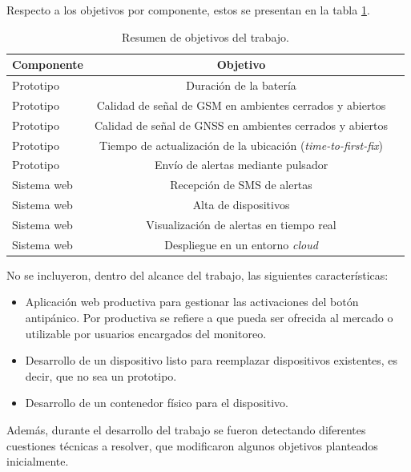 Respecto a los objetivos por componente, estos se presentan en la tabla \ref{tab:objetivos-iniciales}.
\begin{table}[h]
	\centering
	\caption[Resumen de objetivos del trabajo.]{Resumen de objetivos del trabajo.}
	\begin{tabular}{l c c}    
		\toprule
		\textbf{Componente} 	 & \textbf{Objetivo} 	  \\
		\midrule
		Prototipo & Duración de la batería 				\\		
		Prototipo & Calidad de señal de GSM en ambientes cerrados y abiertos			\\
		Prototipo & Calidad de señal de GNSS en ambientes cerrados y abiertos			\\
		Prototipo & Tiempo de actualización de la ubicación (\textit{time-to-first-fix}) \\
		Prototipo & Envío de alertas mediante pulsador		\\
		Sistema web & Recepción de SMS de alertas			\\
		Sistema web & Alta de dispositivos			\\
		Sistema web & Visualización de alertas en tiempo real			\\
		Sistema web & Despliegue en un entorno \textit{cloud}			\\
		\bottomrule
		\hline
	\end{tabular}
	\label{tab:objetivos-iniciales}
\end{table}

No se incluyeron, dentro del alcance del trabajo, las siguientes características:

\begin{itemize}
\item Aplicación web productiva para gestionar las activaciones del botón antipánico. Por productiva se refiere a que pueda ser ofrecida al mercado o utilizable por usuarios encargados del monitoreo.
\item Desarrollo de un dispositivo listo para reemplazar dispositivos existentes, es decir, que no sea un prototipo.
\item Desarrollo de un contenedor físico para el dispositivo.
\end{itemize}

Además, durante el desarrollo del trabajo se fueron detectando diferentes cuestiones técnicas a resolver, que modificaron algunos objetivos planteados inicialmente.



